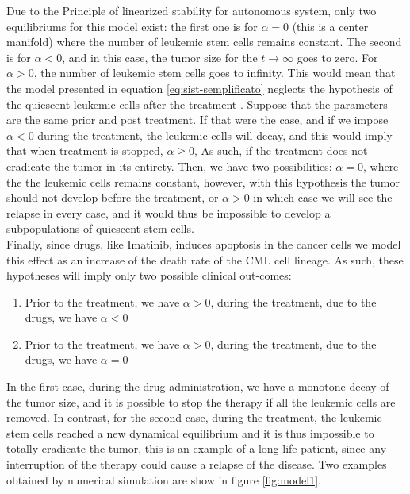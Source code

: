 \documentclass[a4paper,10pt]{article}
\begin{document}
Due to the Principle of linearized stability for autonomous system,
only two equilibriums for this model exist: the first one 
is for $\alpha=0$ (this is a center manifold)
where the number of leukemic stem cells remains constant.
The second is for $\alpha < 0$, and in this case, 
the tumor size for the $t\longrightarrow\infty$ goes to zero.
For $\alpha>0$, the number of leukemic stem cells goes to infinity. 
This would mean that
the model presented in equation 
\eqref{eq:sist-semplificato} neglects
the hypothesis of the quiescent leukemic cells after the treatment 
\cite{zhang2010effective, zhou2015leukemia, graham2002primitive,bruns2009hematopoietic}.
Suppose that the parameters are the same prior and post treatment.
If that were the case, and
if we impose $\alpha<0$ during the treatment, 
the leukemic cells will decay, and this would imply that when treatment is stopped,
$\alpha\geq 0$,
As such, if the treatment does not eradicate the tumor in its entirety.
Then, we have two possibilities:  $\alpha=0$, where the the leukemic cells remains constant, 
however, with this hypothesis
the tumor should not develop before the treatment, or $\alpha>0$  in which case
we will see the relapse in every case,
and it would thus be impossible to develop a subpopulations of quiescent stem cells.\\
Finally, since drugs, like Imatinib, induces apoptosis in the cancer cells
\cite{effetto-imatinib-1, effetto-imatinib-2, effetto-imatinib-3} 
we model this effect as an increase of the death rate of the CML cell lineage. 
As such, these hypotheses will imply only two possible clinical out-comes:
\begin{enumerate}
\item Prior to the treatment, we have $\alpha>0$,
during the treatment, due to the drugs, we have $\alpha<0$
\item Prior to the treatment, we have $\alpha>0$,
during the treatment, due to the drugs, we have $\alpha=0$
\end{enumerate}
In the first case, during the drug administration, we have a monotone decay of the tumor size,
and it is possible to stop the therapy if all the leukemic cells are removed. In contrast,
for the second case, during the treatment, the leukemic stem cells
reached a new dynamical equilibrium 
and it is thus  impossible to totally eradicate the tumor, 
this is an example of a long-life patient, since any interruption 
of the therapy could cause a relapse of the disease.
Two examples obtained by numerical simulation
are show in figure \ref{fig:model1}.
\end{document}
